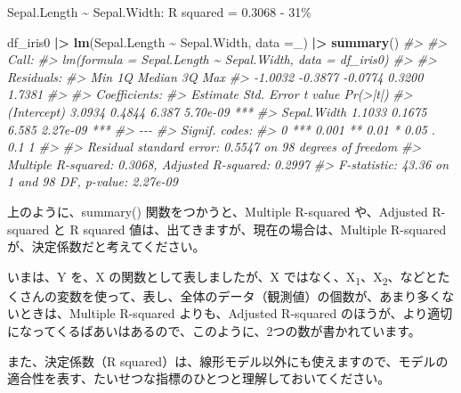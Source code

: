 \documentclass[
  xelatex, ja=standard]{bxjsbook}
\newenvironment{Shaded}{\begin{snugshade}}{\end{snugshade}}
\newcommand{\AttributeTok}[1]{\textcolor[rgb]{0.13,0.29,0.53}{#1}}
\newcommand{\CommentTok}[1]{\textcolor[rgb]{0.56,0.35,0.01}{\textit{#1}}}
\newcommand{\FunctionTok}[1]{\textcolor[rgb]{0.13,0.29,0.53}{\textbf{#1}}}
\newcommand{\NormalTok}[1]{#1}
\newcommand{\SpecialCharTok}[1]{\textcolor[rgb]{0.81,0.36,0.00}{\textbf{#1}}}
\theoremstyle{definition}
\theoremstyle{definition}
\theoremstyle{definition}
\theoremstyle{definition}
\theoremstyle{remark}
\begin{document}
Sepal.Length \textasciitilde{} Sepal.Width: R squared = 0.3068 - 31\%

\begin{Shaded}
\begin{Highlighting}[]
\NormalTok{df\_iris0 }\SpecialCharTok{|\textgreater{}} \FunctionTok{lm}\NormalTok{(Sepal.Length }\SpecialCharTok{\textasciitilde{}}\NormalTok{ Sepal.Width, }\AttributeTok{data =}\NormalTok{\_) }\SpecialCharTok{|\textgreater{}} \FunctionTok{summary}\NormalTok{()}
\CommentTok{\#\textgreater{} }
\CommentTok{\#\textgreater{} Call:}
\CommentTok{\#\textgreater{} lm(formula = Sepal.Length \textasciitilde{} Sepal.Width, data = df\_iris0)}
\CommentTok{\#\textgreater{} }
\CommentTok{\#\textgreater{} Residuals:}
\CommentTok{\#\textgreater{}     Min      1Q  Median      3Q     Max }
\CommentTok{\#\textgreater{} {-}1.0032 {-}0.3877 {-}0.0774  0.3200  1.7381 }
\CommentTok{\#\textgreater{} }
\CommentTok{\#\textgreater{} Coefficients:}
\CommentTok{\#\textgreater{}             Estimate Std. Error t value Pr(\textgreater{}|t|)    }
\CommentTok{\#\textgreater{} (Intercept)   3.0934     0.4844   6.387 5.70e{-}09 ***}
\CommentTok{\#\textgreater{} Sepal.Width   1.1033     0.1675   6.585 2.27e{-}09 ***}
\CommentTok{\#\textgreater{} {-}{-}{-}}
\CommentTok{\#\textgreater{} Signif. codes:  }
\CommentTok{\#\textgreater{} 0 \textquotesingle{}***\textquotesingle{} 0.001 \textquotesingle{}**\textquotesingle{} 0.01 \textquotesingle{}*\textquotesingle{} 0.05 \textquotesingle{}.\textquotesingle{} 0.1 \textquotesingle{} \textquotesingle{} 1}
\CommentTok{\#\textgreater{} }
\CommentTok{\#\textgreater{} Residual standard error: 0.5547 on 98 degrees of freedom}
\CommentTok{\#\textgreater{} Multiple R{-}squared:  0.3068, Adjusted R{-}squared:  0.2997 }
\CommentTok{\#\textgreater{} F{-}statistic: 43.36 on 1 and 98 DF,  p{-}value: 2.27e{-}09}
\end{Highlighting}
\end{Shaded}

上のように、summary() 関数をつかうと、Multiple R-squared や、Adjusted R-squared と R squared 値は、出てきますが、現在の場合は、Multiple R-squared が、決定係数だと考えてください。

いまは、Y を、X の関数として表しましたが、X ではなく、X\textsubscript{1}、X\textsubscript{2}、などとたくさんの変数を使って、表し、全体のデータ（観測値）の個数が、あまり多くないときは、Multiple R-squared よりも、Adjusted R-squared のほうが、より適切になってくるばあいはあるので、このように、2つの数が書かれています。

また、決定係数（R squared）は、線形モデル以外にも使えますので、モデルの適合性を表す、たいせつな指標のひとつと理解しておいてください。
\end{document}
